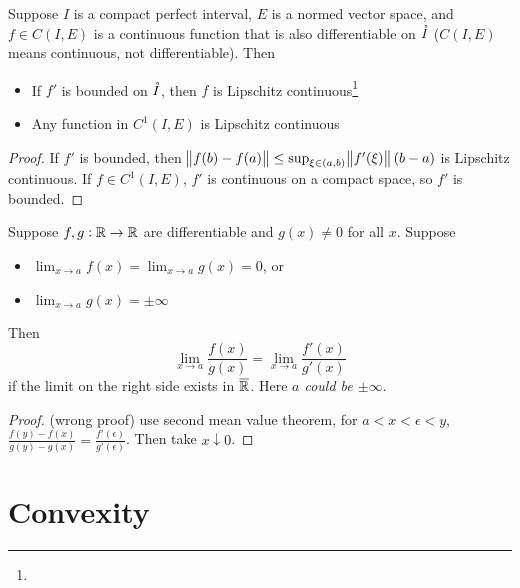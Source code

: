 \begin{theorem}
    Suppose $I$ is a compact perfect interval, $E$ is a normed vector space, and $f \in C(I,E)$ is a continuous function that is also differentiable on $\mathring{I}$ ($C(I,E)$ means continuous, not differentiable). Then
    \begin{itemize}
        \item If $f'$ is bounded on $\mathring{I}$, then $f$ is Lipschitz continuous\footnote{}
        \item Any function in $C^1(I,E)$ is Lipschitz continuous
    \end{itemize}
\end{theorem}
\begin{proof}
    If $f'$ is bounded, then $\norm{f(b) - f(a)} \leq \sup_{\xi \in (a,b)} \norm{f'(\xi)}(b-a)$ is Lipschitz continuous. If $f \in C^1(I,E)$, $f'$ is continuous on a compact space, so $f'$ is bounded.
\end{proof}


\begin{theorem}\label{hospital_rule}
    Suppose $f,g: \mathbb{R} \rightarrow \mathbb{R}$ are differentiable and $g(x) \neq 0$ for all $x$. Suppose
    \begin{itemize}
        \item $\displaystyle \lim_{x\rightarrow a} f(x) = \lim_{x\rightarrow a} g(x) = 0$, or
        \item $\displaystyle \lim_{x\rightarrow a} g(x) = \pm \infty$
    \end{itemize}
    Then
    \begin{equation}
        \lim_{x\rightarrow a}\frac{f(x)}{g(x)} = \lim_{x\rightarrow a}\frac{f'(x)}{g'(x)}
    \end{equation}
    if the limit on the right side exists in \emph{$\overline{\mathbb{R}}$}. Here \emph{$a$ could be $\pm \infty$}.
\end{theorem}
\begin{proof}
    (wrong proof) use second mean value theorem, for $a < x < \epsilon < y$, $\frac{f(y) - f(x)}{g(y) - g(x)} = \frac{f'(\epsilon)}{g'(\epsilon)}$. Then take $x \downarrow 0$.
\end{proof}






\section{Convexity}

